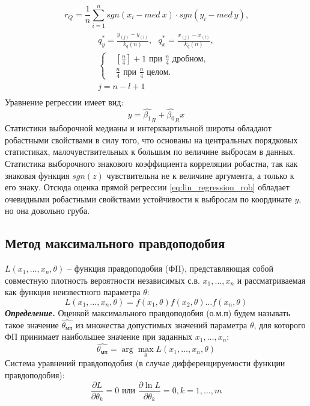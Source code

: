 \documentclass[main.tex]{subfiles}
\begin{document}
\begin{equation}
	r_Q = \dfrac{1}{n} \sum_{i=1}^n sgn (x_i - med \ x) \cdot sgn (y_i - med \ y) \text{,}
\end{equation}
\begin{multline}
	\\
	q^{*}_{y} = \frac{y_{(j)} -y_{(l)}}{k_{q}(n)},~~~
	q^{*}_{x} = \frac{x_{(j)} - x_{(l)}}{k_{q}(n)}, \\ 
	\begin{cases}
		& [\frac{n}{4}] + 1 \text{ при } \frac{n}{4} \text{ дробном, } \\ 
		& \frac{n}{4} \text{ при } \frac{n}{4} \text{ целом. }
	\end{cases}\\
	j = n - l + 1\\  
\end{multline}
Уравнение регрессии имеет вид:
\begin{equation} \label{eq:lin_regression_rob}
	y = \hat{\beta_1}_R + \hat{\beta_0}_R x
\end{equation}
Статистики выборочной медианы и интерквартильной широты обладают робастными свойствами в силу того, что основаны на центральных порядковых статистиках, малочувствительных к большим по величине выбросам в данных. Статистика выборочного знакового коэффициента корреляции робастна, так как знаковая функция $sgn(z)$ чувствительна не к величине аргумента, а только к его знаку. Отсюда оценка прямой регрессии \eqref{eq:lin_regression_rob} обладает очевидными робастными свойствами устойчивости к выбросам по координате $y$, но она довольно груба.

\subsection{Метод максимального правдоподобия}
$L(x_1, \dots, x_n, \theta)$ -- функция правдоподобия (ФП), представляющая собой совместную плотность вероятности независимых с.в. $x_1, \dots, x_n$ и рассматриваемая как функция неизвестного параметра $\theta$:
\begin{equation}
	L(x_1, \dots, x_n, \theta) = f(x_1, \theta) f(x_2, \theta) \dots f(x_n, \theta)
\end{equation}
\textbf{\emph{Определение.}}  Оценкой максимального правдоподобия (о.м.п) будем
называть такое значение $\hat{\theta_{мп}}$ из множества допустимых значений
параметра $\theta$, для которого ФП принимает наибольшее значение при заданных
$x_1, \dots, x_n$:
\begin{equation}
	\hat{\theta_{мп}} = \arg \max_\theta L(x_1, \dots, x_n, \theta)
\end{equation}
Система уравнений правдоподобия (в случае дифференцируемости функции правдоподобия):
\begin{equation}
	\dfrac{\partial L}{\partial \theta_k} = 0 \text{ или } \dfrac{\partial \ln L}{\partial \theta_k} = 0, k = 1, \dots, m
\end{equation}
\end{document}
